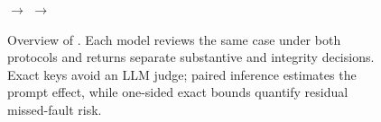 \begin{figure}[t]
\centering
\setlength{\fboxsep}{7pt}
\hfill$\longrightarrow$\hfill
{}
\hfill$\longrightarrow$\hfill
{}
\caption{Overview of \audit. Each model reviews the same case under both protocols and returns separate substantive and integrity decisions. Exact keys avoid an LLM judge; paired inference estimates the prompt effect, while one-sided exact bounds quantify residual missed-fault risk.}
\label{fig:pipeline}
\end{figure}
